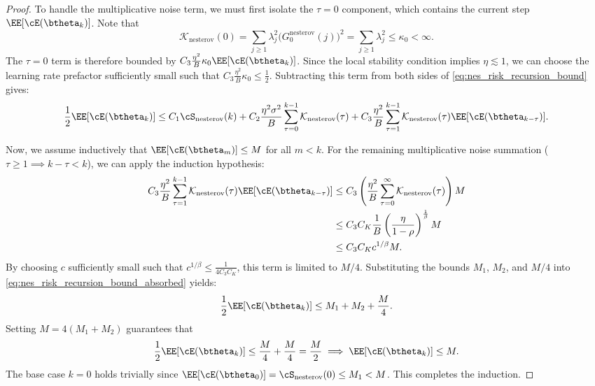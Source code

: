 \documentclass[11pt]{article}
\newcommand{\nesterov}{\mathrm{nesterov}}
\begin{document}
\begin{proof}
To handle the multiplicative noise term, we must first isolate the $\tau=0$ component, which contains the current step $\EE[\cE(\btheta_k)]$. Note that
\[
    \mathcal{K}_{\nesterov}(0) = \sum_{j\ge1} \lambda_j^2 \bigl(G_0^{\nesterov}(j)\bigr)^2 = \sum_{j\ge1} \lambda_j^2 \le \kappa_0 < \infty.
\]
The $\tau=0$ term is therefore bounded by $C_3 \frac{\eta^2}{B} \kappa_0 \EE[\cE(\btheta_k)]$. Since the local stability condition implies $\eta \lesssim 1$, we can choose the learning rate prefactor sufficiently small such that $C_3 \frac{\eta^2}{B} \kappa_0 \le \frac{1}{2}$. Subtracting this term from both sides of \eqref{eq:nes_risk_recursion_bound} gives:
\begin{equation} \label{eq:nes_risk_recursion_bound_absorbed}
    \frac{1}{2} \EE[\cE(\btheta_k)] \le C_1 \cS_{\nesterov}(k) + C_2 \frac{\eta^2\sigma^2}{B}\sum_{\tau=0}^{k-1}\mathcal{K}_{\nesterov}(\tau) + C_3 \frac{\eta^2}{B}\sum_{\tau=1}^{k-1}\mathcal{K}_{\nesterov}(\tau)\EE[\cE(\btheta_{k-\tau})].
\end{equation}

Now, we assume inductively that $\EE[\cE(\btheta_m)] \le M$ for all $m < k$. For the remaining multiplicative noise summation ($\tau \ge 1 \implies k-\tau < k$), we can apply the induction hypothesis:
\begin{align*}
    C_3 \frac{\eta^2}{B}\sum_{\tau=1}^{k-1}\mathcal{K}_{\nesterov}(\tau)\EE[\cE(\btheta_{k-\tau})] 
    &\le C_3 \left( \frac{\eta^2}{B} \sum_{\tau=0}^{\infty} \mathcal{K}_{\nesterov}(\tau) \right) M \\
    &\le C_3 C_K \frac{1}{B} \left(\frac{\eta}{1-\rho}\right)^{\frac1\beta} M \\
    &\le C_3 C_K c^{1/\beta} M.
\end{align*}
By choosing $c$ sufficiently small such that $c^{1/\beta} \le \frac{1}{4 C_3 C_K}$, this term is limited to $M/4$. Substituting the bounds $M_1$, $M_2$, and $M/4$ into \eqref{eq:nes_risk_recursion_bound_absorbed} yields:
\[
    \frac{1}{2} \EE[\cE(\btheta_k)] \le M_1 + M_2 + \frac{M}{4}.
\]
Setting $M = 4(M_1 + M_2)$ guarantees that
\[
    \frac{1}{2} \EE[\cE(\btheta_k)] \le \frac{M}{4} + \frac{M}{4} = \frac{M}{2} 
    \implies 
    \EE[\cE(\btheta_k)] \le M.
\]
The base case $k=0$ holds trivially since $\EE[\cE(\btheta_0)] = \cS_{\nesterov}(0) \le M_1 < M$. This completes the induction.
\end{proof}
\end{document}
